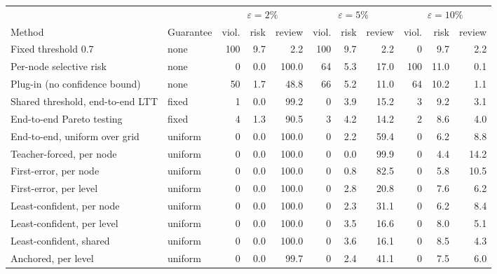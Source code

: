 \begin{tabular}{llrrrrrrrrr}
\toprule
 & & \multicolumn{3}{c}{$\varepsilon=2\%$} & \multicolumn{3}{c}{$\varepsilon=5\%$} & \multicolumn{3}{c}{$\varepsilon=10\%$} \\
\cmidrule(lr){3-5}\cmidrule(lr){6-8}\cmidrule(lr){9-11}
Method & Guarantee & viol. & risk & review & viol. & risk & review & viol. & risk & review \\
\midrule
Fixed threshold 0.7 & none & 100 & 9.7 & 2.2 & 100 & 9.7 & 2.2 & 0 & 9.7 & 2.2 \\
Per-node selective risk & none & 0 & 0.0 & 100.0 & 64 & 5.3 & 17.0 & 100 & 11.0 & 0.1 \\
Plug-in (no confidence bound) & none & 50 & 1.7 & 48.8 & 66 & 5.2 & 11.0 & 64 & 10.2 & 1.1 \\
\midrule
Shared threshold, end-to-end LTT & fixed & 1 & 0.0 & 99.2 & 0 & 3.9 & 15.2 & 3 & 9.2 & 3.1 \\
End-to-end Pareto testing & fixed & 4 & 1.3 & 90.5 & 3 & 4.2 & 14.2 & 2 & 8.6 & 4.0 \\
End-to-end, uniform over grid & uniform & 0 & 0.0 & 100.0 & 0 & 2.2 & 59.4 & 0 & 6.2 & 8.8 \\
\midrule
Teacher-forced, per node & uniform & 0 & 0.0 & 100.0 & 0 & 0.0 & 99.9 & 0 & 4.4 & 14.2 \\
First-error, per node & uniform & 0 & 0.0 & 100.0 & 0 & 0.8 & 82.5 & 0 & 5.8 & 10.5 \\
First-error, per level & uniform & 0 & 0.0 & 100.0 & 0 & 2.8 & 20.8 & 0 & 7.6 & 6.2 \\
\midrule
Least-confident, per node & uniform & 0 & 0.0 & 100.0 & 0 & 2.3 & 31.1 & 0 & 6.2 & 8.4 \\
Least-confident, per level & uniform & 0 & 0.0 & 100.0 & 0 & 3.5 & 16.6 & 0 & 8.0 & 5.1 \\
Least-confident, shared & uniform & 0 & 0.0 & 100.0 & 0 & 3.6 & 16.1 & 0 & 8.5 & 4.3 \\
Anchored, per level & uniform & 0 & 0.0 & 99.7 & 0 & 2.4 & 41.1 & 0 & 7.5 & 6.0 \\
\bottomrule
\end{tabular}
